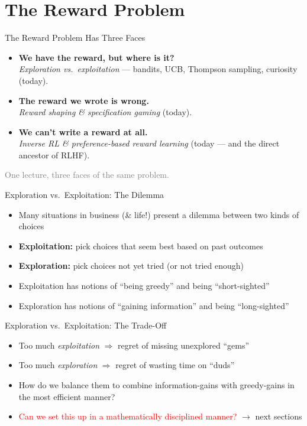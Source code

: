 \section{The Reward Problem}
\begin{frame}{The Reward Problem Has Three Faces}
\begin{itemize}
    \setlength{\itemsep}{0.7em}
    \item \textbf{We have the reward, but where is it?}\\
          \emph{Exploration vs.\ exploitation} --- bandits, UCB, Thompson sampling, curiosity (today).
    \item \textbf{The reward we wrote is wrong.}\\
          \emph{Reward shaping \& specification gaming} (today).
    \item \textbf{We can't write a reward at all.}\\
          \emph{Inverse RL \& preference-based reward learning} (today --- and the direct ancestor of RLHF).
\end{itemize}
\vspace{0.6em}
\centering\small\textcolor{gray}{One lecture, three faces of the same problem.}
\end{frame}

\begin{frame}{Exploration vs.\ Exploitation: The Dilemma}
\begin{itemize}
    \setlength{\itemsep}{0.5em}
    \item Many situations in business (\& life!) present a dilemma between two kinds of choices
    \item \textbf{Exploitation:} pick choices that seem best based on past outcomes
    \item \textbf{Exploration:} pick choices not yet tried (or not tried enough)
    \item Exploitation has notions of ``being greedy'' and being ``short-sighted''
    \item Exploration has notions of ``gaining information'' and being ``long-sighted''
\end{itemize}
\end{frame}

\begin{frame}{Exploration vs.\ Exploitation: The Trade-Off}
\begin{itemize}
    \setlength{\itemsep}{0.6em}
    \item Too much \emph{exploitation} $\Rightarrow$ regret of missing unexplored ``gems''
    \item Too much \emph{exploration} $\Rightarrow$ regret of wasting time on ``duds''
    \item How do we balance them to combine information-gains with greedy-gains in the most efficient manner?
    \item \textcolor{red}{Can we set this up in a mathematically disciplined manner?} $\to$ next sections
\end{itemize}
\end{frame}

